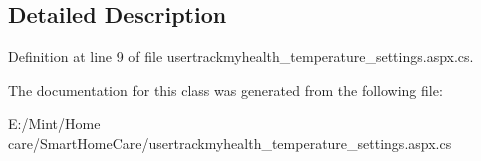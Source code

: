 \subsection{Detailed Description}


Definition at line 9 of file usertrackmyhealth\-\_\-temperature\-\_\-settings.\-aspx.\-cs.



The documentation for this class was generated from the following file\-:\begin{DoxyCompactItemize}
\item 
E\-:/\-Mint/\-Home care/\-Smart\-Home\-Care/usertrackmyhealth\-\_\-temperature\-\_\-settings.\-aspx.\-cs\end{DoxyCompactItemize}

